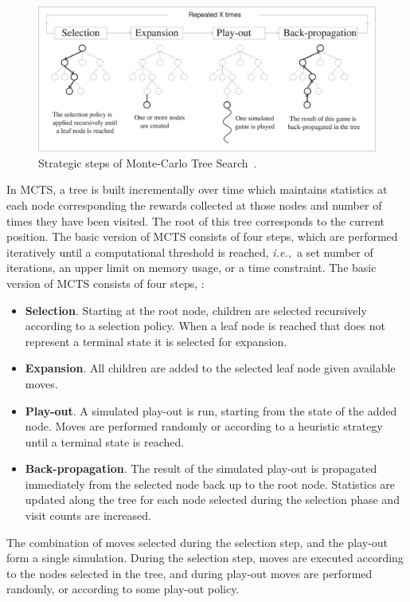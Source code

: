 \documentclass{kecsmstr}
\newcommand{\ie}{{\it i.e.,}~}
\begin{document}
\begin{figure}[ht]
	\centering
	\includegraphics[width=1.\textwidth]{img/figure1.eps}
	\caption{Strategic steps of Monte-Carlo Tree Search~\protect{}.}
	\label{fig:mcts-algorithm}
\end{figure}
\noindent In MCTS, a tree is built incrementally over time which maintains statistics at each node corresponding the rewards collected at those nodes and number of times  they have been visited. The root of this tree corresponds to the current position. The basic version of MCTS consists of four steps, which are performed iteratively until a computational threshold is reached, \ie a set number of iterations, an upper limit on memory usage, or a time constraint. The basic version of MCTS consists of four steps, :
\begin{itemize}
\item {\bf Selection}. Starting at the root node, children are selected recursively according to a selection policy. When a leaf node is reached that does not represent a terminal state it is selected for expansion.
\item {\bf Expansion}. All children are added to the selected leaf node given available moves.
\item {\bf Play-out}. A simulated play-out is run, starting from the state of the added node. Moves are performed randomly or according to a heuristic strategy until a terminal state is reached.
\item {\bf Back-propagation}. The result of the simulated play-out is propagated immediately from the selected node back up to the root node. Statistics are updated along the tree for each node selected during the selection phase and visit counts are increased.
\end{itemize}
The combination of moves selected during the selection step, and the play-out form a single simulation. During the selection step, moves are executed according to the nodes selected in the tree, and during play-out moves are performed randomly, or according to some play-out policy.
\end{document}
